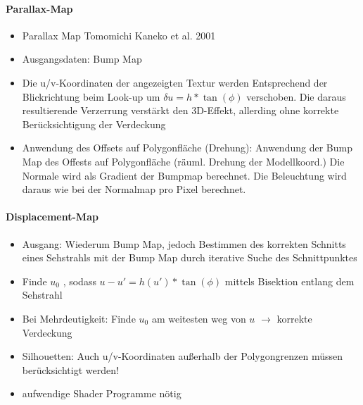\documentclass[10pt,landscape]{article}
\begin{document}
\begin{multicols}{3}
\paragraph{Parallax-Map}
\begin{itemize}
  \item Parallax Map Tomomichi Kaneko et al. 2001
  \item Ausgangsdaten: Bump Map
  \item Die u/v-Koordinaten der angezeigten Textur werden Entsprechend der Blickrichtung beim Look-up um $\delta u = h * \tan(\phi)$ verschoben. Die daraus resultierende Verzerrung verstärkt den 3D-Effekt, allerding ohne korrekte Berücksichtigung der Verdeckung
  \item Anwendung des Offsets auf Polygonfläche (Drehung): Anwendung der Bump Map des Offests auf Polygonfläche (räuml. Drehung der Modellkoord.) Die Normale wird als Gradient der Bumpmap berechnet. Die Beleuchtung wird daraus wie bei der Normalmap pro Pixel berechnet.
\end{itemize}

\paragraph{Displacement-Map}
\begin{itemize}
  \item Ausgang: Wiederum Bump Map, jedoch Bestimmen des korrekten Schnitts eines Sehstrahls mit der Bump Map durch iterative Suche des Schnittpunktes
  \item Finde $u_0$ , sodass $u-u' = h(u') * \tan(\phi)$ mittels Bisektion entlang dem Sehstrahl
  \item Bei Mehrdeutigkeit: Finde $u_0$ am weitesten weg von $u$ $\rightarrow$ korrekte Verdeckung
  \item Silhouetten: Auch u/v-Koordinaten außerhalb der Polygongrenzen müssen berücksichtigt werden!
  \item aufwendige Shader Programme nötig
\end{itemize}


\end{multicols}
\end{document}

